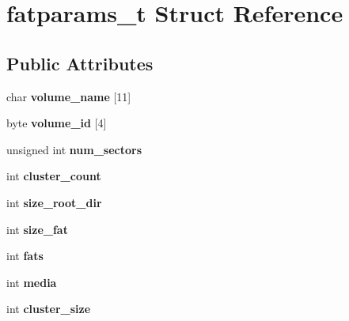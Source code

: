 \hypertarget{structfatparams__t}{}\section{fatparams\+\_\+t Struct Reference}
\label{structfatparams__t}
\subsection*{Public Attributes}
\begin{DoxyCompactItemize}
\item 
\mbox{\label{structfatparams__t_a262e639ef3f66f361284ab70f00dad48}} 
char {\bfseries volume\+\_\+name} \mbox{[}11\mbox{]}
\item 
\mbox{\label{structfatparams__t_aa112bc5981b8ad23fa5f12062f96258a}} 
byte {\bfseries volume\+\_\+id} \mbox{[}4\mbox{]}
\item 
\mbox{\label{structfatparams__t_aede4ca7cbfd75e1755044e0483b875b5}} 
unsigned int {\bfseries num\+\_\+sectors}
\item 
\mbox{\label{structfatparams__t_a38b587086a0499991fbf0153947e8197}} 
int {\bfseries cluster\+\_\+count}
\item 
\mbox{\label{structfatparams__t_a67347f71aa65aa8fcd74cbc90b8b07af}} 
int {\bfseries size\+\_\+root\+\_\+dir}
\item 
\mbox{\label{structfatparams__t_a4b8a5541907f0be3b92eee6ed11a6942}} 
int {\bfseries size\+\_\+fat}
\item 
\mbox{\label{structfatparams__t_acaa2dcafdc6bce8aa261ed47691852fb}} 
int {\bfseries fats}
\item 
\mbox{\label{structfatparams__t_a012e1005ead6601fd281d845676f264e}} 
int {\bfseries media}
\item 
\mbox{\label{structfatparams__t_aefcaf595b77233a5ddcf8043aa3e356f}} 
int {\bfseries cluster\+\_\+size}
\item 
\mbox{\label{structfatparams__t_a0561d312c7a34e3e991e67db4ef2131b}} 

\end{DoxyCompactItemize}
